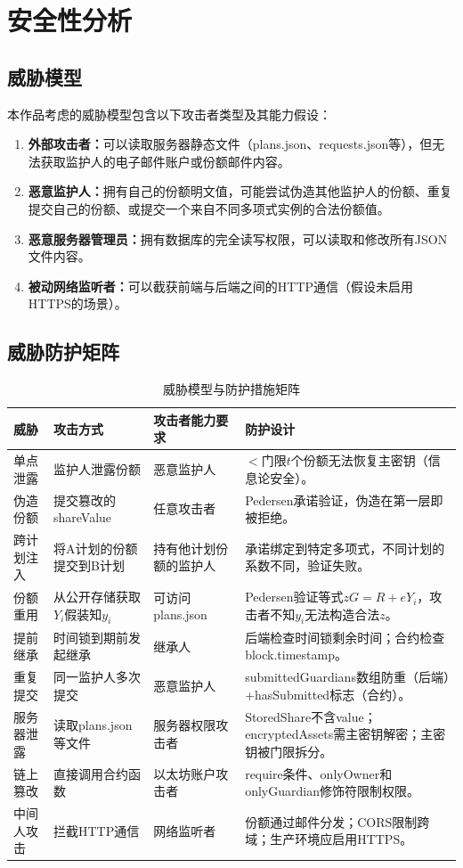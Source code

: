 \documentclass[UTF8,a4paper,zihao=-4,openany]{ctexrep}
\begin{document}
\section{安全性分析}

\subsection{威胁模型}

本作品考虑的威胁模型包含以下攻击者类型及其能力假设：

\begin{enumerate}
  \item \textbf{外部攻击者：}可以读取服务器静态文件（plans.json、requests.json等），但无法获取监护人的电子邮件账户或份额邮件内容。
  \item \textbf{恶意监护人：}拥有自己的份额明文值，可能尝试伪造其他监护人的份额、重复提交自己的份额、或提交一个来自不同多项式实例的合法份额值。
  \item \textbf{恶意服务器管理员：}拥有数据库的完全读写权限，可以读取和修改所有JSON文件内容。
  \item \textbf{被动网络监听者：}可以截获前端与后端之间的HTTP通信（假设未启用HTTPS的场景）。
\end{enumerate}

\subsection{威胁防护矩阵}

\begin{table}[htbp]
\centering
\small
\caption{威胁模型与防护措施矩阵}
\setlength{\extrarowheight}{3pt}
\begin{tabularx}{\textwidth}{p{2.5cm}p{3.5cm}p{3.5cm}X}
\toprule
威胁 & 攻击方式 & 攻击者能力要求 & 防护设计\\
\midrule
单点泄露 & 监护人泄露份额 & 恶意监护人 & $<$门限$t$个份额无法恢复主密钥（信息论安全）。\\
伪造份额 & 提交篡改的shareValue & 任意攻击者 & Pedersen承诺验证，伪造在第一层即被拒绝。\\
跨计划注入 & 将A计划的份额提交到B计划 & 持有他计划份额的监护人 & 承诺绑定到特定多项式，不同计划的系数不同，验证失败。\\
份额重用 & 从公开存储获取$Y_i$假装知$y_i$ & 可访问plans.json & Pedersen验证等式$zG=R+eY_i$，攻击者不知$y_i$无法构造合法$z$。\\
提前继承 & 时间锁到期前发起继承 & 继承人 & 后端检查时间锁剩余时间；合约检查block.timestamp。\\
重复提交 & 同一监护人多次提交 & 恶意监护人 & submittedGuardians数组防重（后端）+hasSubmitted标志（合约）。\\
服务器泄露 & 读取plans.json等文件 & 服务器权限攻击者 & StoredShare不含value；encryptedAssets需主密钥解密；主密钥被门限拆分。\\
链上篡改 & 直接调用合约函数 & 以太坊账户攻击者 & require条件、onlyOwner和onlyGuardian修饰符限制权限。\\
中间人攻击 & 拦截HTTP通信 & 网络监听者 & 份额通过邮件分发；CORS限制跨域；生产环境应启用HTTPS。\\
\bottomrule
\end{tabularx}
\end{table}
\end{document}
